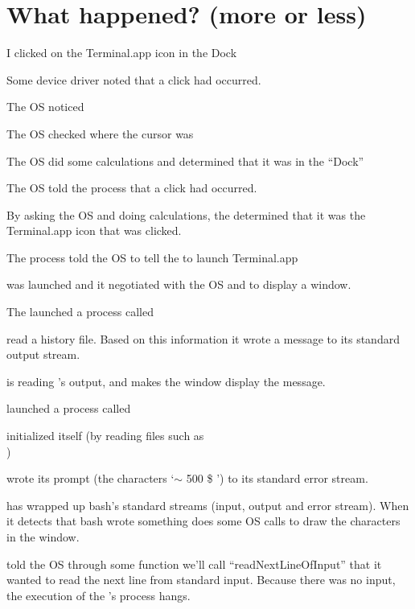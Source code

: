 \documentclass[landscape]{foils}
\begin{document}
\section*{What happened? (more or less)}
\begin{compactitem}
	\item I clicked on the Terminal.app icon in the Dock
	\item Some device driver noted that a click had occurred.
	\item The OS noticed
	\item The OS checked where the cursor was
	\item The OS did some calculations and determined that it was in the ``Dock''
	\item The OS told the  process that a click had occurred.
	\item By asking the OS and doing calculations, the  determined that it was the Terminal.app icon that was clicked.
	\item The  process told the OS to tell the  to launch Terminal.app
	\item {} was launched and {\color{green} it negotiated with the OS and  to display a window.}
	\item {\color{green} The  launched a process called }
	\item {\color{black}  read a history file. Based on this information it wrote a message to its standard output stream. }
	\item {\color{green}  is reading 's output, and  makes the window display the message.}
	\item {\color{black}  launched a process called }
	\item {\color{red}  initialized itself (by reading files such as\\ )}
	\item {\color{red} wrote its prompt (the characters `$\sim$ 500 \$ ') to its standard error stream.}
	\item {\color{green} has wrapped up bash's standard streams (input, output and error stream). When
	it detects that bash wrote something  does some OS calls to draw the characters in the window.}
	\item {\color{red} told the OS through some function we'll call ``readNextLineOfInput'' that it wanted to read the next line from standard input.  Because there was no input, the execution of the 's process hangs.}

\end{compactitem}
\end{document}
